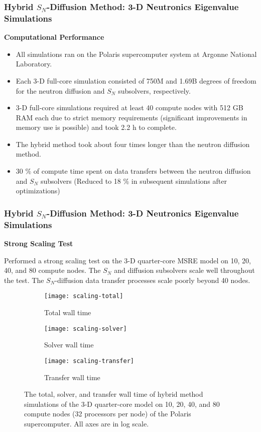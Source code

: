 \begin{frame}
  \frametitle{Hybrid $S_N$-Diffusion Method: 3-D Neutronics Eigenvalue Simulations}
  \textbf{Computational Performance}
  \begin{itemize}
    \item All simulations ran on the Polaris supercomputer system at Argonne National Laboratory.
    \item Each 3-D full-core simulation consisted of 750M and 1.69B degrees of freedom for the
      neutron diffusion and $S_N$ subsolvers, respectively.
    \item 3-D full-core simulations required at least 40 compute nodes with 512 GB RAM each due to
      strict memory requirements (significant improvements in memory use is possible) and took 2.2
      h to complete.
    \item The hybrid method took about four times longer than the neutron diffusion method.
    \item 30 \% of compute time spent on data transfers between the neutron diffusion and $S_N$
      subsolvers (Reduced to 18 \% in subsequent simulations after optimizations)
  \end{itemize}
\end{frame}

\begin{frame}
  \frametitle{Hybrid $S_N$-Diffusion Method: 3-D Neutronics Eigenvalue Simulations}
  \textbf{Strong Scaling Test}
  \vspace{.2cm}

  Performed a strong scaling test on the 3-D quarter-core MSRE model on 10, 20, 40, and 80 compute
  nodes. The $S_N$ and diffusion subsolvers scale well throughout the test.
  The $S_N$-diffusion data transfer processes scale poorly beyond 40 nodes.
  \begin{figure}[t]
    \centering
    \begin{subfigure}[b]{0.32\columnwidth}
      \centering
      \texttt{[image: scaling-total]}
      \caption{Total wall time}
    \end{subfigure}
    \begin{subfigure}[b]{0.32\columnwidth}
      \centering
      \texttt{[image: scaling-solver]}
      \caption{Solver wall time}
    \end{subfigure}
    \begin{subfigure}[b]{0.32\columnwidth}
      \centering
      \texttt{[image: scaling-transfer]}
      \caption{Transfer wall time}
    \end{subfigure}
    \caption{The total, solver, and transfer wall time of hybrid method simulations of the 3-D
    quarter-core model on 10, 20, 40, and 80 compute nodes (32 processors per node) of the Polaris
    supercomputer. All axes are in log scale.}
    \label{fig:scaling}
  \end{figure}
\end{frame}
